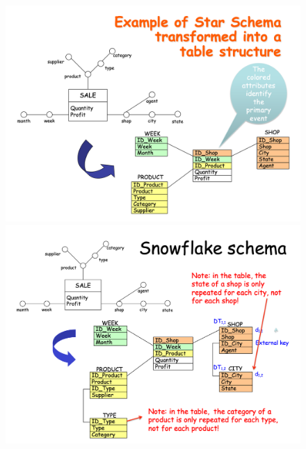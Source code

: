 \documentclass[10pt,a4paper]{article}
\begin{document}
\begin{figure}[htp]
\centering
\includegraphics[width=.4\textwidth]{images/star}\hfill
\includegraphics[width=.4\textwidth]{images/snowflake}\hfill
\end{figure}
\end{document}
